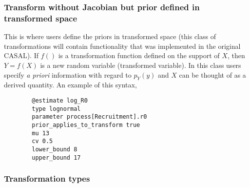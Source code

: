 \subsubsection*{Transform without Jacobian but prior defined in transformed space}
This is where users define the priors in transformed space (this class of transformations will contain functionality that was implemented in the original CASAL). If $f()$ is a transformation function defined on the support of $X$, then $Y = f(X)$ is a new random variable (transformed variable). In this class users specify \textit{a priori} information with regard to $p_Y(y)$ and $X$ can be thought of as a derived quantity. An example of this syntax,

{\small{\begin{verbatim}
		@estimate log_R0
		type lognormal
		parameter process[Recruitment].r0
		prior_applies_to_transform true
		mu 13
		cv 0.5
		lower_bound 8
		upper_bound 17
		\end{verbatim}}}


\subsubsection*{Transformation types}


